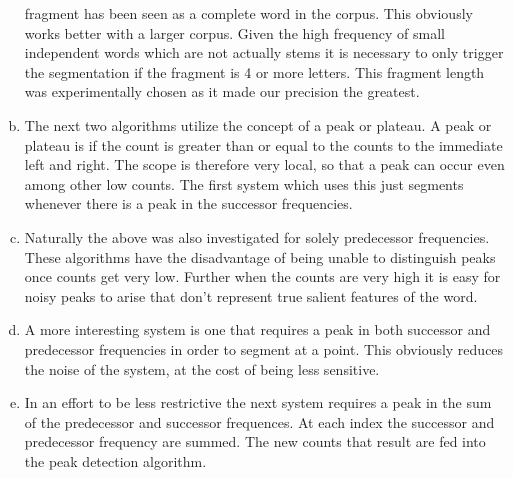 \documentclass[11pt]{article}
\begin{document}
\begin{enumerate}[(a)]
  fragment has been seen as a complete word in the corpus. This obviously
  works better with a larger corpus. Given the high frequency of small 
  independent words which are not actually stems it is necessary to only
  trigger the segmentation if the fragment is 4 or more letters. This fragment
  length was experimentally chosen as it made our precision the greatest.
\item The next two algorithms utilize the concept of a peak or plateau.
  A peak or plateau is if the count is greater than or equal to the counts to
  the immediate left and right. The scope is therefore very local, so that
  a peak can occur even among other low counts. The first system which uses
  this just segments whenever there is a peak in the successor frequencies.
\item Naturally the above was also investigated for solely predecessor
  frequencies. These algorithms have the disadvantage of being unable
  to distinguish peaks once counts get very low. Further when the counts are
  very high it is easy for noisy peaks to arise that don't represent true
  salient features of the word.
\item A more interesting system is one that requires a peak in both 
  successor and predecessor frequencies in order to segment at a point.
  This obviously reduces the noise of the system, at the cost of being
  less sensitive.
\item In an effort to be less restrictive the next system requires a peak
  in the sum of the predecessor and successor frequences. At each index
  the successor and predecessor frequency are summed. The new counts that
  result are fed into the peak detection algorithm.
\end{enumerate}
\end{document}
